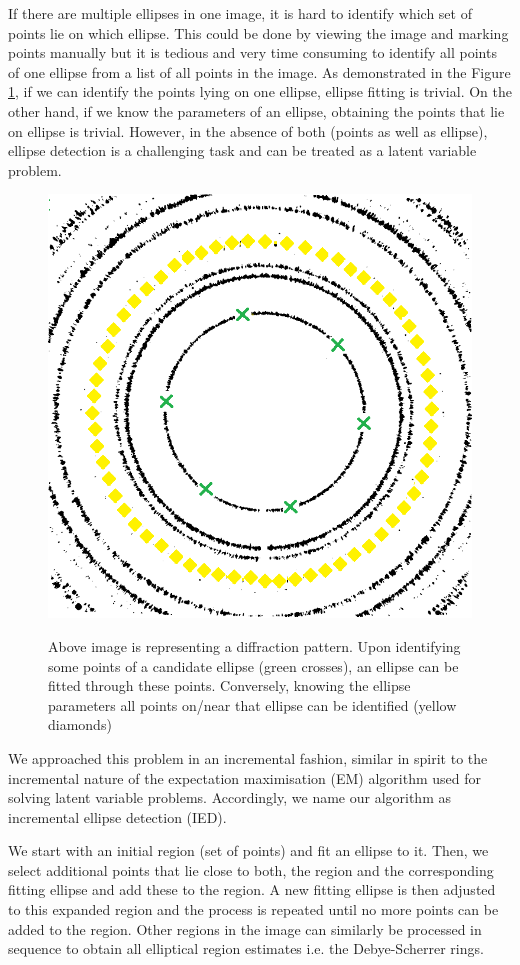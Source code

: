 \documentclass[preprint]{iucr}              %
\newcommand\dsrs{Debye-Scherrer rings}
\begin{document}
If there are multiple ellipses in one image, it is hard to identify which set of
points lie on which ellipse. 
This could be done by viewing the image and marking points manually but it is
tedious and very time consuming to identify all points of one ellipse from a
list of all points in the image.  
As demonstrated in the Figure \ref{fig:chickenandegg}, if we can identify the
points lying on one ellipse, ellipse fitting is trivial. 
On the other hand, if we know the parameters of an ellipse, obtaining the points
that lie on ellipse is trivial. 
However, in the absence of both (points as well as ellipse), ellipse detection
is a challenging task and can be treated as a latent variable problem. 

\begin{figure}
\includegraphics[width=.45\linewidth]{Figures/max1_points_on_ellipse_new.png}
\label{fig:chickenandegg}
\caption{Above image is representing a diffraction pattern. 
Upon identifying some points of a candidate ellipse (green crosses), an ellipse
can be fitted through these points. 
Conversely, knowing the ellipse parameters all points on/near that ellipse can
be identified (yellow diamonds)}
\end{figure}

We approached this problem in an incremental fashion, similar in spirit to the
incremental nature of the expectation maximisation (EM) algorithm
\cite{dempster1977maximum} used for solving latent variable problems.  
Accordingly, we name our algorithm as incremental ellipse detection (IED).

We start with an initial region (set of points) and fit an ellipse to it.
Then, we select additional points that lie close to both, the region and the
corresponding fitting ellipse and add these to the region. 
A new fitting ellipse is then adjusted to this expanded region and the process
is repeated until no more points can be added to the region. 
Other regions in the image can similarly be processed in sequence to obtain all
elliptical region estimates i.e. the {\dsrs}. 
\end{document}
